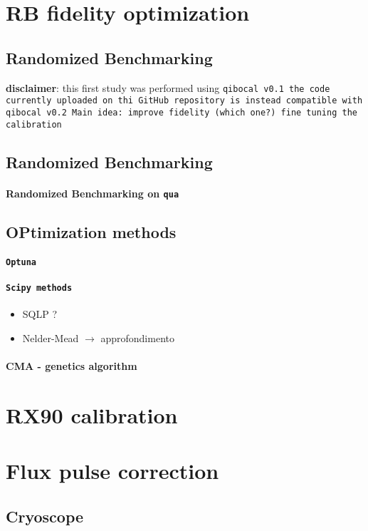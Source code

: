 \section{RB fidelity optimization}

\subsection{Randomized Benchmarking}

\textbf{disclaimer}: this first study was performed using \tt{qibocal v0.1} the code currently uploaded on thi GitHub repository is instead compatible with \tt{qibocal v0.2}
Main idea: improve fidelity (which one?) fine tuning the calibration

\subsection{Randomized Benchmarking}
\paragraph{Randomized Benchmarking on \tt{qua}} %

\subsection{OPtimization methods}
\paragraph{\tt{Optuna}}
\paragraph{\tt{Scipy} methods}
\begin{itemize}
    \item SQLP ?
    \item Nelder-Mead $\rightarrow$ approfondimento
\end{itemize}
\paragraph{CMA - genetics algorithm}

\section{RX90 calibration}

\section{Flux pulse correction}
\subsection{Cryoscope}
\begin{comment}
    TO DO LIST:
    * calcoli analitic per assunzioni del cryoscope
    * calcoli analitici di convoluzioni per dimostrare che è giusto il modo in cui combiniamo i filtri
    * costruire script per analisi dati
    * eventualmente provare ad aggiungere più correzioni esponenziali
\end{comment}
